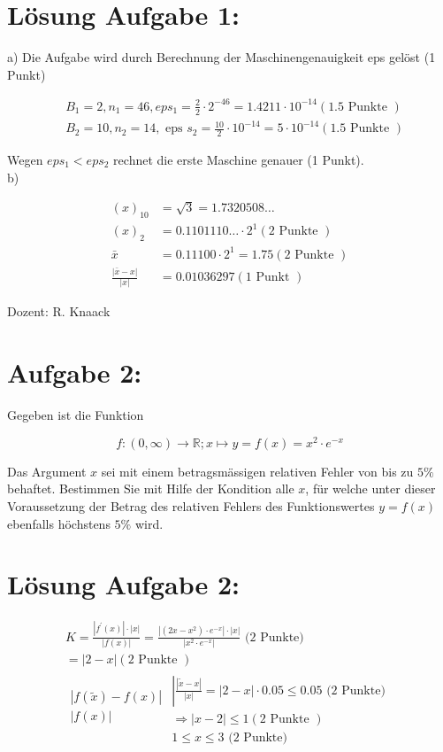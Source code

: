 \documentclass[10pt]{article}
\begin{document}
\section*{Lösung Aufgabe 1:}
a) Die Aufgabe wird durch Berechnung der Maschinengenauigkeit eps gelöst (1 Punkt)

$$
\begin{aligned}
& B_{1}=2, n_{1}=46, e p s_{1}=\frac{2}{2} \cdot 2^{-46}=1.4211 \cdot 10^{-14}(1.5 \text { Punkte }) \\
& B_{2}=10, n_{2}=14, \text { eps } s_{2}=\frac{10}{2} \cdot 10^{-14}=5 \cdot 10^{-14}(1.5 \text { Punkte })
\end{aligned}
$$

Wegen $e p s_{1}<e p s_{2}$ rechnet die erste Maschine genauer (1 Punkt).\\
b)

$$
\begin{aligned}
(x)_{10} & =\sqrt{3}=1.7320508 \ldots \\
(x)_{2} & =0.1101110 \ldots \cdot 2^{1}(2 \text { Punkte }) \\
\bar{x} & =0.11100 \cdot 2^{1}=1.75(2 \text { Punkte }) \\
\frac{|\bar{x}-x|}{|x|} & =0.01036297(1 \text { Punkt })
\end{aligned}
$$

Dozent: R. Knaack

\section*{Aufgabe 2:}
Gegeben ist die Funktion

$$
f:(0, \infty) \longrightarrow \mathbb{R} ; x \mapsto y=f(x)=x^{2} \cdot e^{-x}
$$

Das Argument $x$ sei mit einem betragsmässigen relativen Fehler von bis zu $5 \%$ behaftet. Bestimmen Sie mit Hilfe der Kondition alle $x$, für welche unter dieser Voraussetzung der Betrag des relativen Fehlers des Funktionswertes $y=f(x)$ ebenfalls höchstens $5 \%$ wird.

\section*{Lösung Aufgabe 2:}
$$
\begin{gathered}
K=\frac{\left|f^{\prime}(x)\right| \cdot|x|}{|f(x)|}=\frac{\left|\left(2 x-x^{2}\right) \cdot e^{-x}\right| \cdot|x|}{\left|x^{2} \cdot e^{-x}\right|} \text { (2 Punkte) } \\
=|2-x|(2 \text { Punkte }) \\
\begin{array}{c}
|f(\tilde{x})-f(x)| \\
|f(x)| \\
\end{array} \begin{array}{c}
\left|\frac{|\tilde{x}-x|}{|x|}=|2-x| \cdot 0.05 \leq 0.05\right. \text { (2 Punkte) } \\
\Rightarrow|x-2| \leq 1(2 \text { Punkte }) \\
1 \leq x \leq 3 \text { (2 Punkte) }
\end{array}
\end{gathered}
$$
\end{document}
